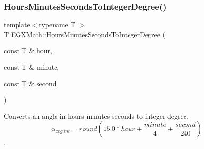 \subsubsection{\texorpdfstring{Hours\+Minutes\+Seconds\+To\+Integer\+Degree()}{HoursMinutesSecondsToIntegerDegree()}}
{\footnotesize\ttfamily template$<$typename T $>$ \\
T E\+G\+X\+Math\+::\+Hours\+Minutes\+Seconds\+To\+Integer\+Degree (\begin{DoxyParamCaption}\item[{const T \&}]{hour,  }\item[{const T \&}]{minute,  }\item[{const T \&}]{second }\end{DoxyParamCaption})}



Converts an angle in hours minutes seconds to integer degree. \[\alpha_{deg\ int}=round(15.0 * hour + \frac{minute}{4} + \frac{second}{240})\]. 

